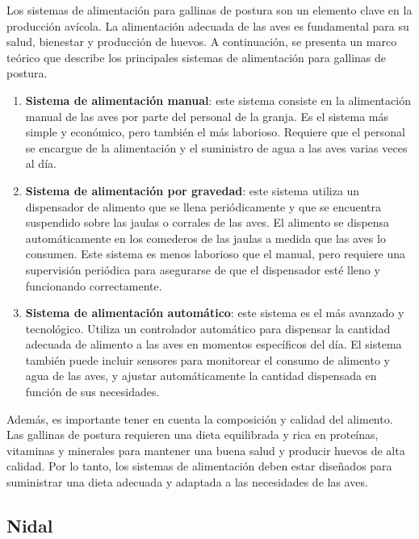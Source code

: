 Los sistemas de alimentación  para gallinas de postura son un elemento clave en la producción avícola. La alimentación adecuada de las aves es fundamental para su salud, bienestar y producción de huevos. A continuación, se presenta un marco teórico que describe los principales sistemas de alimentación para gallinas de postura.

\begin{enumerate}
    \item \textbf{Sistema de alimentación manual}:  este sistema consiste en la alimentación manual de las aves por parte del personal de la granja. Es el sistema más simple y económico, pero también el más laborioso. Requiere que el personal se encargue de la alimentación y el suministro de agua a las aves varias veces al día.
    \item \textbf{Sistema de alimentación por gravedad}:  este sistema utiliza un dispensador de alimento que se llena periódicamente y que se encuentra suspendido sobre las jaulas o corrales de las aves. El alimento se dispensa automáticamente en los comederos de las jaulas a medida que las aves lo consumen. Este sistema es menos laborioso que el manual, pero requiere una supervisión periódica para asegurarse de que el dispensador esté lleno y funcionando correctamente.
    \item \textbf{Sistema de alimentación automático}:  este sistema es el más avanzado y tecnológico. Utiliza un controlador automático para dispensar la cantidad adecuada de alimento a las aves en momentos específicos del día. El sistema también puede incluir sensores para monitorear el consumo de alimento y agua de las aves, y ajustar automáticamente la cantidad dispensada en función de sus necesidades.
\end{enumerate}

Además, es importante tener en cuenta la composición y calidad del alimento. Las gallinas de postura requieren una dieta equilibrada y rica en proteínas, vitaminas y minerales para mantener una buena salud y producir huevos de alta calidad. Por lo tanto, los sistemas de alimentación deben estar diseñados para suministrar una dieta adecuada y adaptada a las necesidades de las aves.

\subsection{Nidal}

